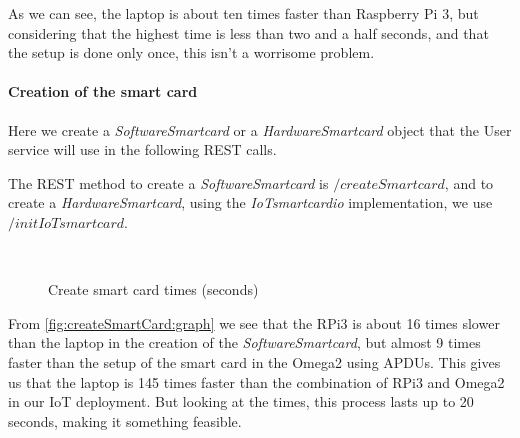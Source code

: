 As we can see, the laptop is about ten times faster than Raspberry Pi 3, but considering that the highest time is less than two and a half seconds, and that the setup is done only once, this isn't a worrisome problem.

\paragraph{Creation of the smart card}
Here we create a \textit{SoftwareSmartcard} or a \textit{HardwareSmartcard} object that the User service will use in the following REST calls.

The REST method to create a \textit{SoftwareSmartcard} is $/createSmartcard$, and to create a \textit{HardwareSmartcard}, using the \textit{IoTsmartcardio} implementation, we use $/initIoTsmartcard$.


\begin{figure}[bth]
	\myfloatalign
	 \quad
	 \\
	\caption{Create smart card times (seconds)}
	\label{fig:createSmartCard:graph}
\end{figure}

From \autoref{fig:createSmartCard:graph} we see that the RPi3 is about 16 times slower than the laptop in the creation of the \textit{SoftwareSmartcard}, but almost 9 times faster than the setup of the smart card in the Omega2 using APDUs. This gives us that the laptop is 145 times faster than the combination of RPi3 and Omega2 in our IoT deployment.
But looking at the times, this process lasts up to 20 seconds, making it something feasible.

